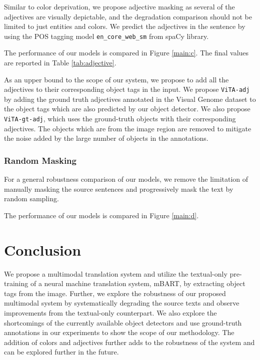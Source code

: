 \documentclass[11pt,a4paper]{article}
\begin{document}
Similar to color deprivation, we propose adjective masking as several of the adjectives are visually depictable, and the degradation comparison should not be limited to just entities and colors. We predict the adjectives in the sentence by using the POS tagging model \texttt{en\_core\_web\_sm} from spaCy library.

The performance of our models is compared in Figure \ref{main:c}. The final values are reported in Table \ref{tab:adjective}.

As an upper bound to the scope of our system, we propose to add all the adjectives to their corresponding object tags in the input. We propose \texttt{ViTA-adj} by adding the ground truth adjectives annotated in the Visual Genome dataset to the object tags which are also predicted by our object detector. We also propose \texttt{ViTA-gt-adj}, which uses the ground-truth objects with their corresponding adjectives. The objects which are from the image region are removed to mitigate the noise added by the large number of objects in the annotations.

\subsubsection{Random Masking}

For a general robustness comparison of our models, we remove the limitation of manually masking the source sentences and progressively mask the text by random sampling.

The performance of our models is compared in Figure \ref{main:d}.

\section{Conclusion}

We propose a multimodal translation system and utilize the textual-only pre-training of a neural machine translation system, mBART, by extracting object tags from the image. Further, we explore the robustness of our proposed multimodal system by systematically degrading the source texts and observe improvements from the textual-only counterpart. We also explore the shortcomings of the currently available object detectors and use ground-truth annotations in our experiments to show the scope of our methodology. The addition of colors and adjectives further adds to the robustness of the system and can be explored further in the future.







\end{document}
